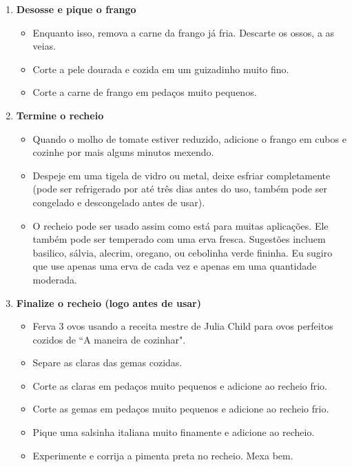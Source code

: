 \documentclass [11pt, letterpaper] {article}
\begin{document}
\begin {description}
\begin{enumerate}
\begin{itemize}
        \item Adicione a cebola picada e refogue por cinco minutos até a cebola começar a dorar.
        \item Adicione 1 colher de chá de mel \`a cebola e continue refogando até ficar bem dourada.
        \item Adicione a lata de tomates e o caldo de galinha reservado.
        \item Deixe cozinhar até que a maioria da água tenha evaporado e a gordura se separe do molho de tomate.
         \end{itemize}
 	\item{\bf Desosse e pique o frango}
	\begin{itemize}       
        \item Enquanto isso, remova a carne da frango j\'a fria. Descarte os ossos, a as veias. 
        \item Corte a pele dourada e cozida em um guizadinho muito fino.
        \item Corte a carne de frango em peda\c{c}os muito pequenos.
         \end{itemize}
 	\item{\bf Termine o recheio}
	\begin{itemize}      
	\item Quando o molho de tomate estiver reduzido, adicione o frango em cubos e cozinhe por mais alguns minutos mexendo.
        \item Despeje em uma tigela de vidro ou metal, deixe esfriar completamente (pode ser refrigerado por até três dias antes do uso, também pode ser congelado e descongelado antes de usar).
        \item O recheio pode ser usado assim como est\'a para muitas aplica\c{c}\~oes. Ele tamb\'em pode ser temperado com uma erva fresca. Sugest\~oes incluem basilico, s\'alvia, alecrim, oregano, ou cebolinha verde fininha. Eu sugiro que use apenas uma erva de cada vez e apenas em uma quantidade moderada.
         \end{itemize}
        \item {\bf Finalize o recheio (logo antes de usar)}
	\begin{itemize} 
	\item Ferva 3 ovos usando a receita mestre de Julia Child para ovos perfeitos cozidos de ``A maneira de cozinhar".
        \item Separe as claras das gemas cozidas.
        \item Corte as claras em peda\c{c}os muito pequenos e adicione ao recheio frio.
        \item Corte as gemas  em peda\c{c}os muito pequenos e adicione ao recheio frio.
        \item Pique uma salsinha italiana muito finamente e adicione ao recheio.
        \item Experimente e corrija a pimenta preta no recheio. Mexa bem.
         \end {itemize}
\end {enumerate}
\end {description}
\end{document}

